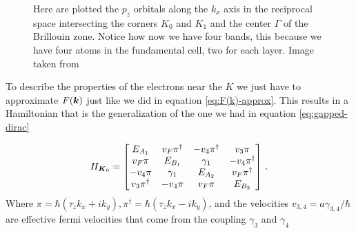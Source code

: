 \begin{figure}[h]
    \caption{Here are plotted the $p_z$ orbitals along the $k_x$ axis in the reciprocal space intersecting the corners $K_0$ and $K_1$ and the center $\Gamma$ of the Brillouin zone. Notice how now we have four bands, this because we have four atoms in the fundamental cell, two for each layer. Image taken from \cite{McCann_2013}}
    \label{fig:dispersion-bilayer}
\end{figure}
To describe the properties of the electrons near the $K$ we just have to approximate $F(\boldsymbol{k})$ just like we did in equation \ref{eq:F(k)-approx}. This results in a Hamiltonian that is the generalization of the one we had in equation \ref{eq:gapped-dirac}

\begin{equation}
    H_{\boldsymbol{K}_0}=
    \begin{bmatrix}
        E_{A_1} & v_F\pi^\dag & -v_4\pi^\dag & v_3\pi\\
        v_F\pi& E_{B_1} & \gamma_1 & -v_4\pi^\dag\\
        -v_4\pi & \gamma_1 & E_{A_2} & v_F\pi^\dag\\
        v_3\pi^\dag & -v_4\pi & v_F\pi & E_{B_2}
    \end{bmatrix}\,.
\end{equation}
Where $\pi= \hbar (\tau_zk_x+ik_y),\pi^\dag=\hbar (\tau_zk_x-ik_y)$, and the velocities $v_{3,4}=a\gamma_{3,4}/\hbar$ are effective fermi velocities that come from the coupling $\gamma_3$ and $\gamma_4$






